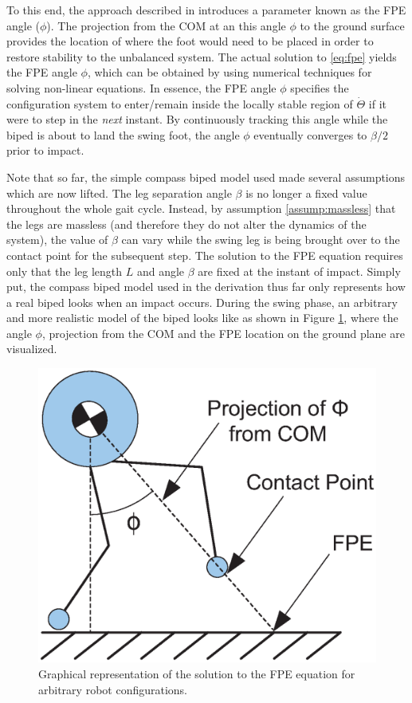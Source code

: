 To this end, the approach described in \cite{Wight:2008vt} introduces a parameter known as the FPE angle ($\phi$). The projection from the COM at an this angle $\phi$ to the ground surface provides the location of where the foot would need to be placed in order to restore stability to the unbalanced system. The actual solution to \eqref{eq:fpe} yields the FPE angle $\phi$, which can be obtained by using numerical techniques for solving non-linear equations. In essence, the FPE angle $\phi$ specifies the configuration system to enter/remain inside the locally stable region of $\dot{\Theta}$ if it were to step in the \textit{next} instant. By continuously tracking this angle while the biped is about to land the swing foot, the angle $\phi$ eventually converges to $\beta/2$ prior to impact.

Note that so far, the simple compass biped model used made several assumptions which are now lifted. The leg separation angle $\beta$ is no longer a fixed value throughout the whole gait cycle. Instead, by assumption \ref{assump:massless} that the legs are massless (and therefore they do not alter the dynamics of the system), the value of $\beta$ can vary while the swing leg is being brought over to the contact point for the subsequent step. The solution to the FPE equation requires only that the leg length $L$ and angle $\beta$ are fixed at the instant of impact. Simply put, the compass biped model used in the derivation thus far only represents how a real biped looks when an impact occurs. During the swing phase, an arbitrary and more realistic model of the biped looks like as shown in Figure \ref{fig:phi}, where the angle $\phi$, projection from the COM and the FPE location on the ground plane are visualized. 

\begin{figure}[h]
	\centering
    \includegraphics[scale=0.6]{fig/fpe/fig5.eps}
  	\caption{Graphical representation of the solution to the FPE equation for arbitrary robot configurations.}
	\label{fig:phi}
\end{figure}

